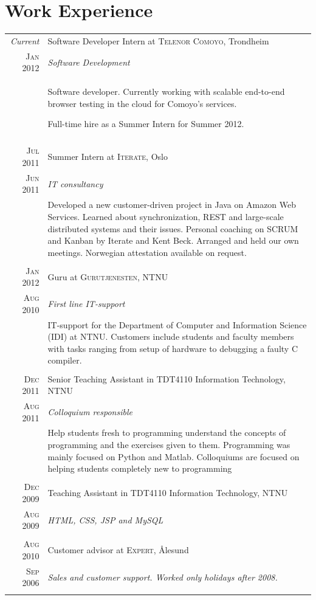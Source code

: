 \documentclass[a4paper,10pt]{article}
\begin{document}
\section{Work Experience}
\begin{tabular}{r|p{12cm}}
  \emph{Current} & Software Developer Intern at \textsc{Telenor Comoyo}, Trondheim \\\textsc{Jan 2012}&\emph{Software Development}\\&\footnotesize{Software developer. Currently working with scalable end-to-end browser testing in the cloud for Comoyo's services.

Full-time hire as a Summer Intern for Summer 2012.}\\\multicolumn{2}{c}{} \\
  \textsc{Jul 2011} & Summer Intern at \textsc{Iterate}, Oslo \\\textsc{Jun 2011}&\emph{IT consultancy}\\&\footnotesize{Developed a new customer-driven project in Java on Amazon Web Services. Learned about synchronization, REST and large-scale distributed systems and their issues. Personal coaching on SCRUM and Kanban by Iterate and Kent Beck. Arranged and held our own meetings. Norwegian attestation available on request.}\\\multicolumn{2}{c}{} \\
  \textsc{Jan 2012} & Guru at \textsc{Gurutjenesten}, NTNU  \\\textsc{Aug 2010}&\emph{First line IT-support}\\&\footnotesize{IT-support for the Department of Computer and Information Science (IDI) at NTNU. Customers include students and faculty members with tasks ranging from setup of hardware to debugging a faulty C compiler.}\\\multicolumn{2}{c}{} \\
  \textsc{Dec 2011} & Senior Teaching Assistant in TDT4110 Information Technology, NTNU  \\\textsc{Aug 2011}&\emph{Colloquium responsible}\\&\footnotesize{Help students fresh to programming understand the concepts of programming and the exercises given to them. Programming was mainly focused on Python and Matlab. Colloquiums are focused on helping students completely new to programming }\\\multicolumn{2}{c}{} \\
  \textsc{Dec 2009} & Teaching Assistant in TDT4110 Information Technology, NTNU  \\ \textsc{Aug 2009}&\emph{HTML, CSS, JSP and MySQL}\\\multicolumn{2}{c}{} \\
  \textsc{Aug 2010} & Customer advisor at \textsc{Expert}, Ålesund \\\textsc{Sep 2006}&\emph{Sales and customer support. Worked only holidays after 2008.}\\\multicolumn{2}{c}{} \\
\end{tabular}
\end{document}
